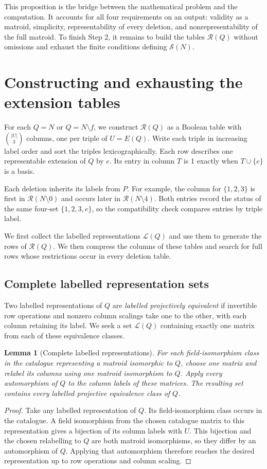 \documentclass[11pt,a4paper]{article}
\newtheorem{lemma}[theorem]{Lemma}
\theoremstyle{definition}
\newcommand{\RR}{\mathcal R}
\begin{document}
This proposition is the bridge between the mathematical problem
and the computation. It accounts for all four requirements on an
output: validity as a matroid, simplicity, representability of every
deletion, and nonrepresentability of the full matroid. To finish
Step 2, it remains to build the tables $\RR(Q)$ without omissions
and exhaust the finite conditions defining $\mathcal S(N)$.

\section{Constructing and exhausting the extension tables}\label{sec:tables}

For each $Q=N$ or $Q=N\setminus f$, we construct $\RR(Q)$ as a
Boolean table with $\binom{|U|}{3}$ columns, one per triple of
$U=E(Q)$.
Write each triple in increasing label order and sort the triples
lexicographically. Each row describes one representable extension
of $Q$ by $e$. Its entry in column $T$ is 1 exactly when
$T\cup\{e\}$ is a basis.

Each deletion inherits its labels from $P$. For example, the column
for $\{1,2,3\}$ is first in $\RR(N\setminus 0)$ and occurs later in
$\RR(N\setminus 4)$. Both entries record the status of the same
four-set $\{1,2,3,e\}$, so the compatibility check compares entries
by triple label.

We first collect the labelled representations $\mathcal L(Q)$ and
use them to generate the rows of $\RR(Q)$. We then compress the
columns of these tables and search for full rows whose restrictions
occur in every deletion table.

\subsection{Complete labelled representation sets}\label{sec:normalization}

Two labelled representations of $Q$ are \emph{labelled projectively
equivalent} if invertible row operations and nonzero column
scalings take one to the other, with each column retaining its
label. We seek a set $\mathcal L(Q)$ containing exactly one matrix
from each of these equivalence classes.

\begin{lemma}[Complete labelled representations]\label{lem:labelled}
For each field-isomorphism class in the catalogue representing a
matroid isomorphic to $Q$, choose one matrix and relabel its columns
using one matroid isomorphism to $Q$. Apply every automorphism of
$Q$ to the column labels of these matrices. The resulting set
contains every labelled projective equivalence class of $Q$.
\end{lemma}
\begin{proof}
Take any labelled representation of $Q$. Its field-isomorphism
class occurs in the catalogue. A field isomorphism from the chosen
catalogue matrix to this representation gives a bijection of its
column labels with $U$. This bijection and the chosen relabelling
to $Q$ are both matroid isomorphisms, so they differ by an
automorphism of $Q$. Applying that automorphism therefore reaches
the desired representation up to row operations and column scaling.
\end{proof}
\end{document}
